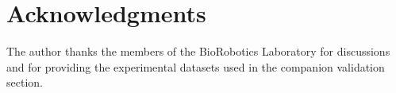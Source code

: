 \documentclass[journal,twoside,10pt]{IEEEtran}
\begin{document}
\section*{Acknowledgments}
The author thanks the members of the BioRobotics Laboratory for
discussions and for providing the experimental datasets used in the
companion validation section.




\end{document}
